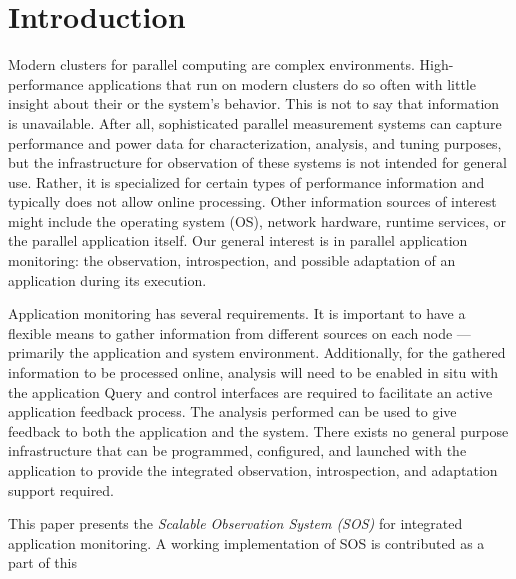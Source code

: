 \section{Introduction}
%
\par
%
Modern clusters for parallel computing are complex environments.
%
High-performance applications that run on modern clusters do so often with
little insight about their or the system's behavior.
%
This is not to say that information is unavailable. 
%
After all, sophisticated parallel measurement systems can capture performance and
power data for characterization, analysis, and tuning purposes, but
the infrastructure for observation of these systems is not intended
for general use.
%
Rather, it is specialized for certain types of performance information
and typically does not allow online processing.
%
Other information sources of interest might include the
operating system (OS), network hardware, runtime services, or the
parallel application itself.
%
Our general interest is in parallel application monitoring: the
observation, introspection, and possible adaptation of an application
during its execution.
%
\par
%
Application monitoring has several requirements.
%
%
It is important to have a flexible means to gather information from
different sources on each node --- primarily the application and
system environment.
%
%
Additionally, for the gathered information to be processed online,
analysis will need to be enabled in situ with the application
%
%
Query and control interfaces are required to facilitate
an active application feedback process.
%
The analysis performed can be used to give feedback to both the
application and the system.
%
There exists no general purpose infrastructure that can be programmed,
configured, and launched with the application to provide the
integrated observation, introspection, and adaptation support
required.
%
\par
%
This paper presents the \textit{Scalable Observation System (SOS)} for
integrated application monitoring.
%
A working implementation of SOS is contributed as a part of this
